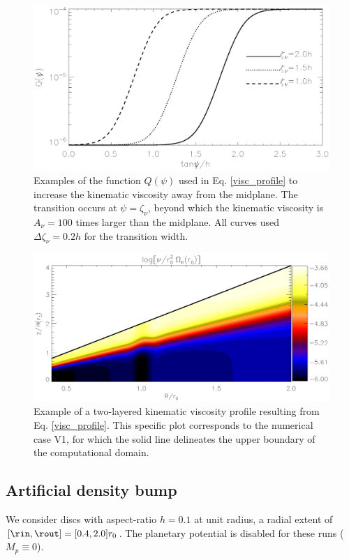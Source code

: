 \begin{figure}
  \centering
  \includegraphics[width=\linewidth]{figures/pdisk_visc}
  \caption{Examples of the function $Q(\psi)$ 
    used in Eq. \ref{visc_profile} to increase
    the kinematic viscosity away from the midplane. The transition 
    occurs at $\psi = \zeta_\nu$, beyond which the kinematic viscosity
    is $A_\nu=100$ times larger than the midplane. All curves used
    $\Delta\zeta_\nu=0.2h$ for the transition width.
    \label{Qpsi}}
\end{figure}


\begin{figure}
  \centering
  \includegraphics[width=\linewidth]{figures/pdisk_visc2d_2}
  \caption{Example of a two-layered kinematic viscosity profile
    resulting from Eq. \ref{visc_profile}. This specific plot
    corresponds to the numerical case V1, for which the solid line
    delineates the upper boundary of the computational domain.
    \label{visc2d}}
\end{figure}

\subsection{Artificial density bump}
We consider discs with aspect-ratio $h=0.1$ at unit radius, 
a radial extent of $[\rin,\rout]=[0.4,2.0]r_0$. The planetary
potential is disabled for these runs ($M_p\equiv 0$).  

